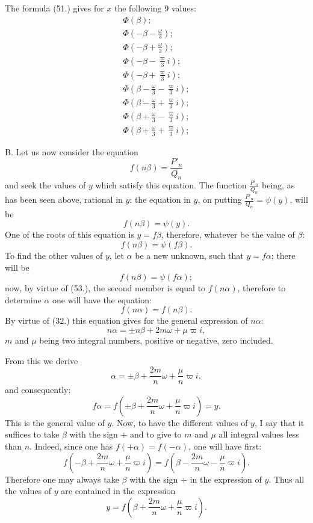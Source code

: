 \documentclass{article}
\begin{document}
The formula (51.) gives for $x$ the following 9 values:
\[ \begin{gathered} \Phi(\beta);\\ \Phi\left(-\beta-\frac{\omega}{3}\right);\\ \Phi\left(-\beta+\frac{\omega}{3}\right);\\ \Phi\left(-\beta-\frac{\varpi}{3}i\right);\\ \Phi\left(-\beta+\frac{\varpi}{3}i\right);\\ \Phi\left(\beta-\frac{\omega}{3}-\frac{\varpi}{3}i\right);\\ \Phi\left(\beta-\frac{\omega}{3}+\frac{\varpi}{3}i\right);\\ \Phi\left(\beta+\frac{\omega}{3}-\frac{\varpi}{3}i\right);\\ \Phi\left(\beta+\frac{\omega}{3}+\frac{\varpi}{3}i\right); \end{gathered} \]


B. Let us now consider the equation
\[ f(n\beta)=\frac{P'_n}{Q_n} \tag{52.} \]
and seek the values of $y$ which satisfy this equation. The function $\frac{P'_n}{Q_n}$ being, as has been seen above, rational in $y$: the equation in $y$, on putting $\frac{P'_n}{Q_n}=\psi(y)$, will be
\[ f(n\beta)=\psi(y). \]
One of the roots of this equation is $y=f\beta$, therefore, whatever be the value of $\beta$:
\[ f(n\beta)=\psi(f\beta). \tag{53.} \]
To find the other values of $y$, let $\alpha$ be a new unknown, such that $y=f\alpha$; there will be
\[ f(n\beta)=\psi(f\alpha); \]
now, by virtue of (53.), the second member is equal to $f(n\alpha)$, therefore to determine $\alpha$ one will have the equation:
\[ f(n\alpha)=f(n\beta). \]
By virtue of (32.) this equation gives for the general expression of $n\alpha$:
\[ n\alpha=\pm n\beta+2m\omega+\mu\varpi i, \]
$m$ and $\mu$ being two integral numbers, positive or negative, zero included.

From this we derive
\[ \alpha=\pm\beta+\frac{2m}{n}\omega+\frac{\mu}{n}\varpi i, \]
and consequently:
\[ f\alpha=f\left(\pm\beta+\frac{2m}{n}\omega+\frac{\mu}{n}\varpi i\right)=y. \]
This is the general value of $y$. Now, to have the different values of $y$, I say that it suffices to take $\beta$ with the sign $+$ and to give to $m$ and $\mu$ all integral values less than $n$. Indeed, since one has $f(+\alpha)=f(-\alpha)$, one will have first:
\[ f\left(-\beta+\frac{2m}{n}\omega+\frac{\mu}{n}\varpi i\right)=f\left(\beta-\frac{2m}{n}\omega-\frac{\mu}{n}\varpi i\right). \]
Therefore one may always take $\beta$ with the sign $+$ in the expression of $y$. Thus all the values of $y$ are contained in the expression
\[ y=f\left(\beta+\frac{2m}{n}\omega+\frac{\mu}{n}\varpi i\right). \tag{54.} \]
\end{document}
